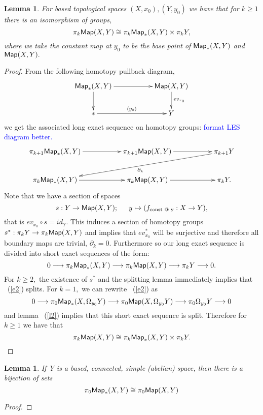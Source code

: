 \documentclass{amsart}
\newtheorem{lemma}[theorem]{Lemma}
\theoremstyle{definition}
\theoremstyle{remark}
\begin{document}
\begin{lemma} \label{l1}
For based topological spaces $(X, x_{0}), (Y, y_{0})$ we have that for $k \geq 1$ there is an isomorphism of groups, $$\pi_{k}{\sf Map}(X, Y) \cong \pi_{k}{\sf Map}_{\ast}(X, Y) \times \pi_{k}Y,$$ where we take the constant map at $y_{0}$ to be the base point of ${\sf Map}_{\ast}(X, Y)$ and ${\sf Map}(X, Y).$
\end{lemma}
\begin{proof}
From the following homotopy pullback diagram, 
$$
\xymatrix{
{\sf Map}_{\ast}(X, Y) \ar[rr]^-{} \ar[d]^-{}
&&
{\sf Map}(X, Y) \ar[d]^-{ev_{x_{0}}}
\\
\ast \ar[rr]^-{\langle y_{0} \rangle} 
&&
Y
}$$
we get the associated long exact sequence on homotopy groups:
\textcolor{blue}{format LES diagram better.}
$$
\xymatrix{
\pi_{k + 1}{\sf Map}_{\ast}(X, Y) \ar[rr]^-{} 
&&
\pi_{k + 1}{\sf Map}(X, Y) \ar[rr]^-{}
&&
\pi_{k + 1}Y \ar[dllll]^{\partial_{k}}
\\
\pi_{k}{\sf Map}_{\ast}(X, Y) \ar[rr]^-{} 
&&
\pi_{k}{\sf Map}(X, Y) \ar[rr]^-{}
&&
\pi_{k}Y. 
}
$$
Note that we have a section of spaces
$$s:Y \rightarrow {\sf Map}(X, Y); \hspace{15 pt} y \mapsto (f_{\text{const @ y}}: X \rightarrow Y),$$ that is $ev_{x_{0}} \circ s = id_{Y}.$ This induces a section of homotopy groups $s^{\ast}: \pi_{k}Y \rightarrow \pi_{k}{\sf Map}(X, Y)$ and implies that $ev_{x_{0}}^{\ast}$ will be surjective and therefore all boundary maps are trivial, $\partial_{k} = 0.$ 
Furthermore so our long exact sequence is divided into short exact sequences of the form:
\begin{equation} \label{e2}
0 \longrightarrow \pi_{k}{\sf Map}_{\ast}(X, Y) \longrightarrow \pi_{k}{\sf Map}(X, Y) \longrightarrow \pi_{k}Y \longrightarrow 0.
\end{equation} 
For $k \geq 2,$ the existence of $s^{\ast}$ and the splitting lemma immediately implies that ~(\ref{e2}) splits.
For $k = 1,$ we can rewrite ~(\ref{e2}) as 
$$0 \longrightarrow \pi_{0}{\sf Map}_{\ast}(X, \Omega_{y_{0}}Y) \longrightarrow \pi_{0}{\sf Map}(X, \Omega_{y_{0}}Y) \longrightarrow \pi_{0}\Omega_{y_{0}}Y \longrightarrow 0$$
and lemma ~(\ref{l2}) implies that this short exact sequence is split. Therefore for $k \geq 1$ we have that 
$$\pi_{k}{\sf Map}(X, Y) \cong \pi_{k}{\sf Map}_{\ast}(X, Y) \times \pi_{k}Y.$$
\end{proof}

\begin{lemma}
If Y is a based, connected, simple (abelian) space, then there is a bijection of sets $$\pi_{0}{\sf Map}_{\ast}(X, Y) \cong \pi_{0}{\sf Map}(X, Y)$$ 
\end{lemma}
\begin{proof}
\end{proof}
\end{document}
